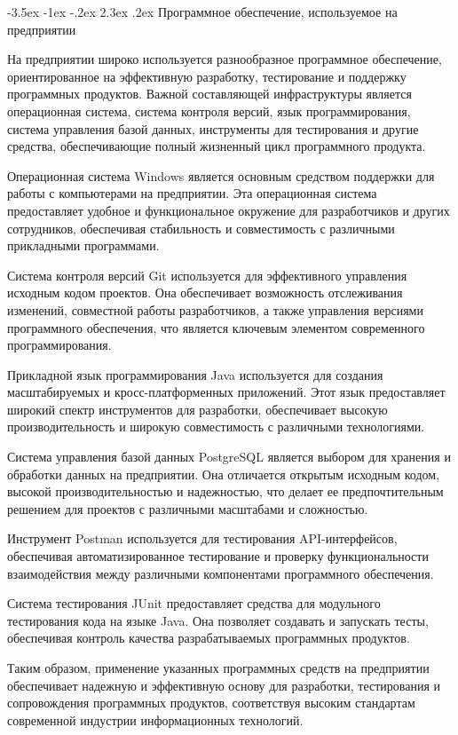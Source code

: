 \documentclass[a4paper,draft]{report}
\makeatletter
\renewcommand\section{\@startsection {section}{1}{\z@}%
  {-3.5ex \@plus -1ex \@minus -.2ex}%
  {2.3ex \@plus.2ex}%
  {\normalfont\newpage\indent\bfseries}}
\makeatother
\begin{document}
\section{Программное обеспечение, используемое на предприятии}

На предприятии широко используется разнообразное программное обеспечение, ориентированное на эффективную разработку, тестирование и поддержку программных продуктов.
Важной составляющей инфраструктуры является операционная система, система контроля версий, язык программирования, система управления базой данных, инструменты для тестирования и другие средства, обеспечивающие полный жизненный цикл программного продукта.

Операционная система Windows является основным средством поддержки для работы с компьютерами на предприятии.
Эта операционная система предоставляет удобное и функциональное окружение для разработчиков и других сотрудников, обеспечивая стабильность и совместимость с различными прикладными программами.

Система контроля версий Git используется для эффективного управления исходным кодом проектов.
Она обеспечивает возможность отслеживания изменений, совместной работы разработчиков, а также управления версиями программного обеспечения, что является ключевым элементом современного программирования.

Прикладной язык программирования Java используется для создания масштабируемых и кросс-платформенных приложений.
Этот язык предоставляет широкий спектр инструментов для разработки, обеспечивает высокую производительность и широкую совместимость с различными технологиями.

Система управления базой данных PostgreSQL является выбором для хранения и обработки данных на предприятии.
Она отличается открытым исходным кодом, высокой производительностью и надежностью, что делает ее предпочтительным решением для проектов с различными масштабами и сложностью.

Инструмент Postman используется для тестирования API-интерфейсов, обеспечивая автоматизированное тестирование и проверку функциональности взаимодействия между различными компонентами программного обеспечения.

Система тестирования JUnit предоставляет средства для модульного тестирования кода на языке Java.
Она позволяет создавать и запускать тесты, обеспечивая контроль качества разрабатываемых программных продуктов.

Таким образом, применение указанных программных средств на предприятии обеспечивает надежную и эффективную основу для разработки, тестирования и сопровождения программных продуктов, соответствуя высоким стандартам современной индустрии информационных технологий.
\end{document}
